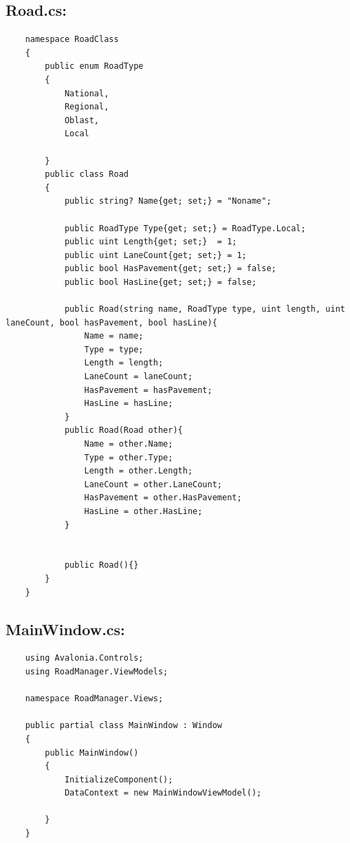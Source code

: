 \documentclass[14pt]{extarticle}
\begin{document}
\subsection{Road.cs:}
\begin{verbatim}
    namespace RoadClass
    {
        public enum RoadType
        {
            National,
            Regional,
            Oblast,
            Local
        
        }
        public class Road
        {
            public string? Name{get; set;} = "Noname";
    
            public RoadType Type{get; set;} = RoadType.Local;
            public uint Length{get; set;}  = 1;
            public uint LaneCount{get; set;} = 1;
            public bool HasPavement{get; set;} = false;
            public bool HasLine{get; set;} = false;
    
            public Road(string name, RoadType type, uint length, uint laneCount, bool hasPavement, bool hasLine){
                Name = name;
                Type = type;
                Length = length;
                LaneCount = laneCount;
                HasPavement = hasPavement;
                HasLine = hasLine;
            }
            public Road(Road other){
                Name = other.Name;
                Type = other.Type;
                Length = other.Length;
                LaneCount = other.LaneCount;
                HasPavement = other.HasPavement;
                HasLine = other.HasLine;
            }
    
    
            public Road(){}
        }
    }
\end{verbatim}

\subsection{MainWindow.cs:}
\begin{verbatim}
    using Avalonia.Controls;
    using RoadManager.ViewModels;
    
    namespace RoadManager.Views;
    
    public partial class MainWindow : Window
    {
        public MainWindow()
        {
            InitializeComponent();
            DataContext = new MainWindowViewModel();
            
        }
    }
    
\end{verbatim}
\end{document}
